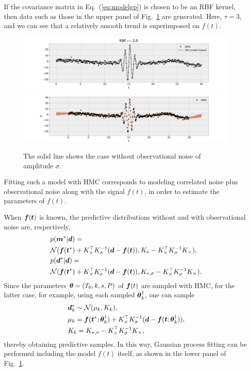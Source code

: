 If the covariance matrix in Eq.~(\ref{eq:modelgp}) is chosen to be an RBF kernel, then data such as those in the upper panel of Fig.~\ref{fig:gp1m} are generated. Here, $\tau=3$, and we can see that a relatively smooth trend is superimposed on $f(t)$.
\begin{figure}[htb]
\begin{center}
\includegraphics[width=\linewidth]{fig/gpmodel/gp1.pdf}
\includegraphics[width=\linewidth]{fig/gpmodel/gp6.pdf}
\caption{The solid line shows the case without observational noise of amplitude $\sigma$.\label{fig:gp1m}}
\end{center}
\end{figure}
Fitting such a model with HMC corresponds to modeling correlated noise plus observational noise along with the signal $f(t)$, in order to estimate the parameters of $f(t)$.

When $\boldsymbol{f}(\boldsymbol{t})$ is known, the predictive distributions without and with observational noise are, respectively,
\begin{align}
\label{eq:predgp_model}
&p(\boldsymbol{m}^\ast|\boldsymbol{d}) =   \nonumber \\
&\mathcal{N} (\boldsymbol{f}(\boldsymbol{t}^\ast) + K_{\times}^\top K_\sigma^{-1}  (\boldsymbol{d} - \boldsymbol{f}(\boldsymbol{t})),  K_{\ast} - K_\times^\top K_\sigma^{-1} K_\times), \\
&p(\boldsymbol{d}^\ast|\boldsymbol{d}) =   \nonumber \\
&\mathcal{N} (\boldsymbol{f}(\boldsymbol{t}^\ast) + K_{\times}^\top K_\sigma^{-1} (\boldsymbol{d} - \boldsymbol{f}(\boldsymbol{t})), K_{\ast,\sigma} - K_\times^\top K_\sigma^{-1} K_\times).
\end{align}
Since the parameters $\boldsymbol{\theta}=(T_0,k,s,P)$ of $\boldsymbol{f}(t)$ are sampled with HMC, for the latter case, for example, using each sampled $\boldsymbol{\theta}^\dagger_k$, one can sample
\begin{align}
\label{eq:predgp2_}
&\boldsymbol{d}^\ast_k \sim  \mathcal{N} (\mu_k, K_k), \\
&\mu_k = \boldsymbol{f}(\boldsymbol{t}^\ast; \boldsymbol{\theta}^\dagger_k) + K_{\times}^\top K_\sigma^{-1} (\boldsymbol{d} - \boldsymbol{f}(\boldsymbol{t}; \boldsymbol{\theta}^\dagger_k)), \\
&K_k = K_{\ast,\sigma} - K_\times^\top K_\sigma^{-1} K_\times,
\end{align}
thereby obtaining predictive samples. In this way, Gaussian process fitting can be performed including the model $f(t)$ itself, as shown in the lower panel of Fig.~\ref{fig:gp1m}.
